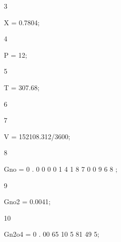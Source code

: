 \documentclass[a4paper,portrait,12pt]{article}
\begin{document}
3





\begin{flushleft}
X = 0.7804;
\end{flushleft}





4





\begin{flushleft}
P = 12;
\end{flushleft}





5





\begin{flushleft}
T = 307.68;
\end{flushleft}





6


7





\begin{flushleft}
V = 152108.312/3600;
\end{flushleft}





8





\begin{flushleft}
Gno = 0 . 0 0 0 0 1 4 1 8 7 0 0 9 6 8 ;
\end{flushleft}





9





\begin{flushleft}
Gno2 = 0.0041;
\end{flushleft}





10





\begin{flushleft}
Gn2o4 = 0 . 00 65 10 5 81 49 5;
\end{flushleft}
\end{document}
